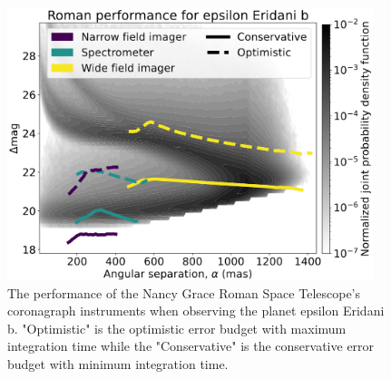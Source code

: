 \begin{figure}
  \begin{center}
    \includegraphics[width=0.95\textwidth]{ch2/figures/RST_performance_flipped.png}
  \end{center}
  \caption{The performance of the Nancy Grace Roman Space Telescope's coronagraph
    instruments when observing the planet epsilon Eridani b. "Optimistic" is the
  optimistic error budget with maximum integration time while the "Conservative"
  is the conservative error budget with minimum integration time.}
  \label{fig:RST_performance_flipped}
\end{figure}

